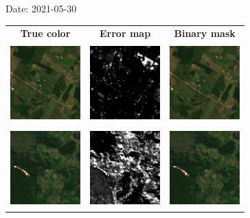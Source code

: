 \documentclass{beamer}
\begin{document}
\begin{frame}{Date: 2021-05-30}
    \begin{tabular}{ccc}
        \textbf{True color} & \textbf{Error map} & \textbf{Binary mask}\\
        \includegraphics[width=2.7cm,height=3cm]{Figures/v6/20210530/TCI_zoom3.png}& \includegraphics[width=2.7cm,height=3cm]{Figures/v6/20210530/error_map_zoom3.png} &\includegraphics[width=2.7cm,height=3cm]{Figures/v6/20210530/zoom3_BI.png}\\
        \includegraphics[width=2.7cm,height=3cm]{Figures/v6/20210530/TCI_zoom4.png}& \includegraphics[width=2.7cm,height=3cm]{Figures/v6/20210530/error_map_zoom4.png} &\includegraphics[width=2.7cm,height=3cm]{Figures/v6/20210530/zoom4_BI.png}\\
        \end{tabular}
\end{frame}
\end{document}
